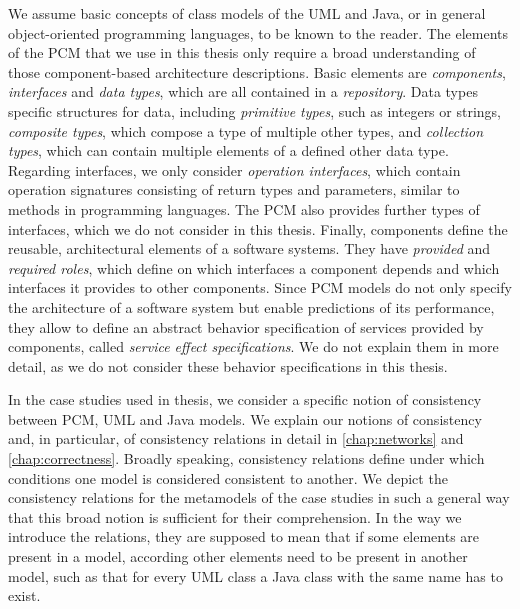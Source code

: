 We assume basic concepts of class models of the \gls{UML} and Java, or in general object-oriented programming languages, to be known to the reader.
The elements of the \gls{PCM} that we use in this thesis only require a broad understanding of those component-based architecture descriptions.
Basic elements are \emph{components}, \emph{interfaces} and \emph{data types}, which are all contained in a \emph{repository}.
Data types specific structures for data, including \emph{primitive types}, such as integers or strings, \emph{composite types}, which compose a type of multiple other types, and \emph{collection types}, which can contain multiple elements of a defined other data type.
Regarding interfaces, we only consider \emph{operation interfaces}, which contain operation signatures consisting of return types and parameters, similar to methods in programming languages.
The \gls{PCM} also provides further types of interfaces, which we do not consider in this thesis.
Finally, components define the reusable, architectural elements of a software systems.
They have \emph{provided} and \emph{required roles}, which define on which interfaces a component depends and which interfaces it provides to other components.
Since \gls{PCM} models do not only specify the architecture of a software system but enable predictions of its performance, they allow to define an abstract behavior specification of services provided by components, called \emph{service effect specifications}.
We do not explain them in more detail, as we do not consider these behavior specifications in this thesis.

In the case studies used in thesis, we consider a specific notion of consistency between \gls{PCM}, \gls{UML} and Java models.
We explain our notions of consistency and, in particular, of consistency relations in detail in \autoref{chap:networks} and \autoref{chap:correctness}.
Broadly speaking, consistency relations define under which conditions one model is considered consistent to another.
We depict the consistency relations for the metamodels of the case studies in such a general way that this broad notion is sufficient for their comprehension.
In the way we introduce the relations, they are supposed to mean that if some elements are present in a model, according other elements need to be present in another model, such as that for every \gls{UML} class a Java class with the same name has to exist.

